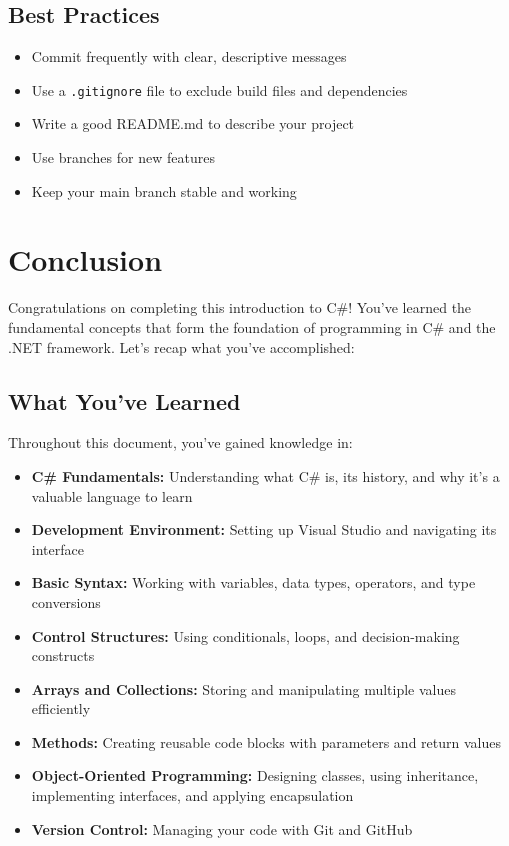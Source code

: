\documentclass{article}
\begin{document}
\subsection{Best Practices}
\begin{itemize}
    \item Commit frequently with clear, descriptive messages
    \item Use a \texttt{.gitignore} file to exclude build files and dependencies
    \item Write a good README.md to describe your project
    \item Use branches for new features
    \item Keep your main branch stable and working
\end{itemize}

\section{Conclusion}

Congratulations on completing this introduction to C\#! You've learned the fundamental concepts that form the foundation of programming in C\# and the .NET framework. Let's recap what you've accomplished:

\subsection{What You've Learned}
Throughout this document, you've gained knowledge in:

\begin{itemize}
    \item \textbf{C\# Fundamentals:} Understanding what C\# is, its history, and why it's a valuable language to learn
    \item \textbf{Development Environment:} Setting up Visual Studio and navigating its interface
    \item \textbf{Basic Syntax:} Working with variables, data types, operators, and type conversions
    \item \textbf{Control Structures:} Using conditionals, loops, and decision-making constructs
    \item \textbf{Arrays and Collections:} Storing and manipulating multiple values efficiently
    \item \textbf{Methods:} Creating reusable code blocks with parameters and return values
    \item \textbf{Object-Oriented Programming:} Designing classes, using inheritance, implementing interfaces, and applying encapsulation
    \item \textbf{Version Control:} Managing your code with Git and GitHub
\end{itemize}
\end{document}
